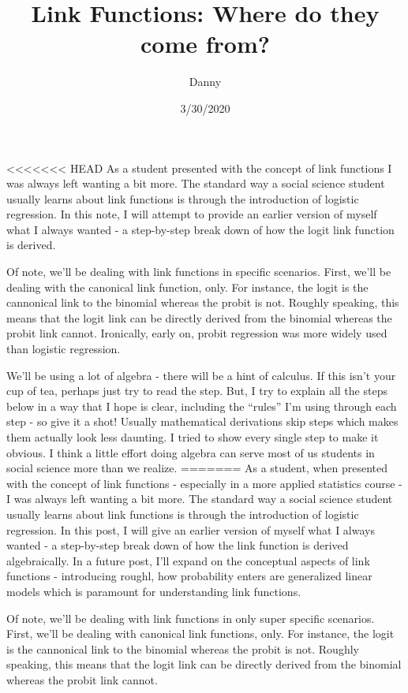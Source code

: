 \documentclass[
]{article}
\title{Link Functions: Where do they come from?}
\author{Danny}
\date{3/30/2020}
\begin{document}
\maketitle

<<<<<<< HEAD
As a student presented with the concept of link functions I was always
left wanting a bit more. The standard way a social science student
usually learns about link functions is through the introduction of
logistic regression. In this note, I will attempt to provide an earlier
version of myself what I always wanted - a step-by-step break down of
how the logit link function is derived.

Of note, we'll be dealing with link functions in specific scenarios.
First, we'll be dealing with the canonical link function, only. For
instance, the logit is the cannonical link to the binomial whereas the
probit is not. Roughly speaking, this means that the logit link can be
directly derived from the binomial whereas the probit link cannot.
Ironically, early on, probit regression was more widely used than
logistic regression.

We'll be using a lot of algebra - there will be a hint of calculus. If
this isn't your cup of tea, perhaps just try to read the step. But, I
try to explain all the steps below in a way that I hope is clear,
including the ``rules'' I'm using through each step - so give it a shot!
Usually mathematical derivations skip steps which makes them actually
look less daunting. I tried to show every single step to make it
obvious. I think a little effort doing algebra can serve most of us
students in social science more than we realize.
=======
As a student, when presented with the concept of link functions -
especially in a more applied statistics course - I was always left
wanting a bit more. The standard way a social science student usually
learns about link functions is through the introduction of logistic
regression. In this post, I will give an earlier version of myself what
I always wanted - a step-by-step break down of how the link function is
derived algebraically. In a future post, I'll expand on the conceptual
aspects of link functions - introducing roughl, how probability enters
are generalized linear models which is paramount for understanding link
functions.

Of note, we'll be dealing with link functions in only super specific
scenarios. First, we'll be dealing with canonical link functions, only.
For instance, the logit is the cannonical link to the binomial whereas
the probit is not. Roughly speaking, this means that the logit link can
be directly derived from the binomial whereas the probit link cannot.
\end{document}
